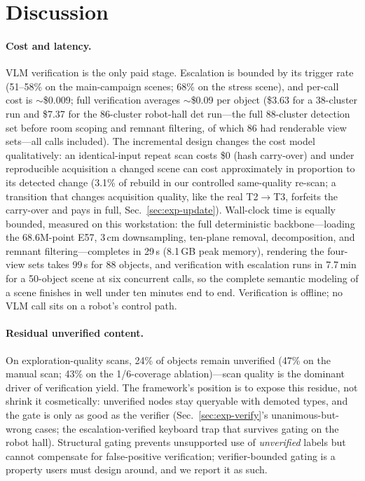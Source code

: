 \section{Discussion}
\label{sec:discussion}

\paragraph{Cost and latency.}
VLM verification is the only paid stage. Escalation is bounded by its
trigger rate (51--58\% on the main-campaign scenes; 68\% on the stress
scene), and per-call cost is $\sim$\$0.009;
full verification averages $\sim$\$0.09 per object (\$3.63 for a 38-cluster
run and \$7.37 for the 86-cluster robot-hall det run---the full 88-cluster
detection set before room scoping and remnant filtering, of which 86 had
renderable view sets---all calls included). The incremental
design changes
the cost model qualitatively: an identical-input repeat scan costs \$0
(hash carry-over) and
under reproducible acquisition a changed scene can cost approximately in
proportion to its detected change (3.1\% of rebuild in our
controlled same-quality re-scan; a transition that changes acquisition
quality, like the real T2$\rightarrow$T3, forfeits the carry-over and pays
in full, Sec.~\ref{sec:exp-update}). Wall-clock time is equally bounded, measured on this
workstation: the full deterministic backbone---loading the 68.6M-point
E57, 3\,cm downsampling, ten-plane removal, decomposition, and remnant
filtering---completes in 29\,s (8.1\,GB peak memory), rendering the
four-view sets takes 99\,s for 88 objects, and verification with
escalation runs in 7.7\,min for a 50-object scene at six concurrent
calls, so the complete semantic modeling of a scene finishes in well
under ten minutes end to end.
Verification is offline; no VLM call sits on a robot's control
path.

\paragraph{Residual unverified content.}
On exploration-quality scans, 24\% of objects remain unverified (47\% on the
manual scan; 43\% on the 1/6-coverage ablation)---scan quality is the
dominant driver of verification yield. The framework's position is to expose
this residue, not shrink it cosmetically: unverified nodes stay queryable
with demoted types, and the gate is only as good as the verifier
(Sec.~\ref{sec:exp-verify}'s unanimous-but-wrong cases; the escalation-verified keyboard trap
that survives gating on the robot hall). Structural gating prevents
unsupported use of \emph{unverified} labels but cannot compensate for
false-positive verification; verifier-bounded gating is a
property users must design around, and we report it as such.

